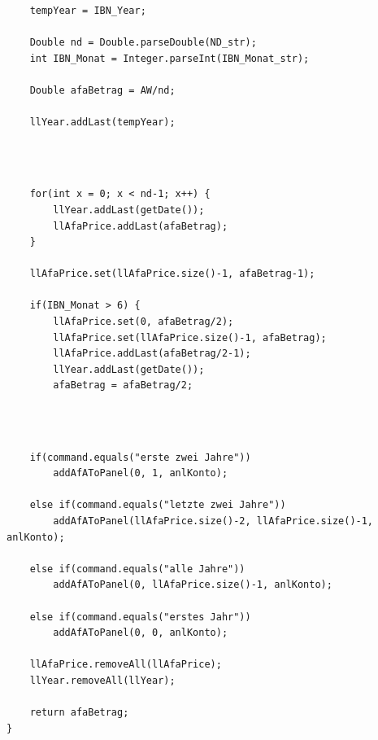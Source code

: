 \documentclass[12pt]{report}
\begin{document}
\subsection{}

\begin{lstlisting}
		
	tempYear = IBN_Year;
		
	Double nd = Double.parseDouble(ND_str);
	int IBN_Monat = Integer.parseInt(IBN_Monat_str);
	
	Double afaBetrag = AW/nd;
	
	llYear.addLast(tempYear);
	
\end{lstlisting}

\subsection{}

\begin{lstlisting}
					
	for(int x = 0; x < nd-1; x++) {
		llYear.addLast(getDate());
		llAfaPrice.addLast(afaBetrag);
	}
	
	llAfaPrice.set(llAfaPrice.size()-1, afaBetrag-1);
	
	if(IBN_Monat > 6) {
		llAfaPrice.set(0, afaBetrag/2);
		llAfaPrice.set(llAfaPrice.size()-1, afaBetrag);
		llAfaPrice.addLast(afaBetrag/2-1);
		llYear.addLast(getDate());
		afaBetrag = afaBetrag/2;
		
\end{lstlisting}

\subsection{}

\begin{lstlisting}
		
	if(command.equals("erste zwei Jahre"))
	    addAfAToPanel(0, 1, anlKonto);
	
	else if(command.equals("letzte zwei Jahre"))
	    addAfAToPanel(llAfaPrice.size()-2, llAfaPrice.size()-1, anlKonto);
	
	else if(command.equals("alle Jahre"))
	    addAfAToPanel(0, llAfaPrice.size()-1, anlKonto);
	
	else if(command.equals("erstes Jahr"))
	    addAfAToPanel(0, 0, anlKonto);
	
	llAfaPrice.removeAll(llAfaPrice);
	llYear.removeAll(llYear);
	
	return afaBetrag;
}
\end{lstlisting}
\end{document}
